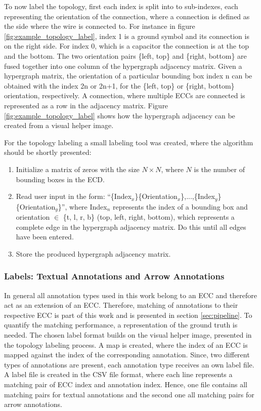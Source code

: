 To now label the topology, first each index is split into to sub-indexes, each representing the orientation of the connection, where a connection is defined as the side where the wire is connected to.
For instance in figure \ref{fig:example_topology_label}, index 1 is a ground symbol and its connection is on the right side.
For index 0, which is a capacitor the connection is at the top and the bottom.
The two orientation pairs \{left, top\} and \{right, bottom\} are fused together into one column of the hypergraph adjacency matrix.
Given a hypergraph matrix, the orientation of a particular bounding box index n can be obtained with the index 2n or 2n+1, for the \{left, top\} or \{right, bottom\} orientation, respectively.
A connection, where multiple \acp{ECC} are connected is represented as a row in the adjacency matrix.
Figure \ref{fig:example_topology_label} shows how the hypergraph adjacency can be created from a visual helper image.

For the topology labeling a small labeling tool was created, where the algorithm should be shortly presented:

\begin{enumerate}
    \item Initialize a matrix of zeros with the size $N \times N$, where $N$ is the number of bounding boxes in the \ac{ECD}.
    \item Read user input in the form: ``\{Index$_x$\}\{Orientation$_x$\},...,\{Index$_y$\}\{Orientation$_y$\}'', where Index$_n$ represents the index of a bounding box and orientation $\in$ \{t, l, r, b\} (top, left, right, bottom),  which represents a complete edge in the hypergraph adjacency matrix. Do this until all edges have been entered.
    \item Store the produced hypergraph adjacency matrix.
\end{enumerate}


\subsubsection{Labels: Textual Annotations and Arrow Annotations}

In general all annotation types used in this work belong to an \ac{ECC} and therefore act as an extension of an \ac{ECC}.
Therefore, matching of annotations to their respective \ac{ECC} is part of this work and is presented in section \ref{sec:pipeline}.
To quantify the matching performance, a representation of the ground truth is needed.
The chosen label format builds on the visual helper image, presented in the topology labeling process.
A map is created, where the index of an \ac{ECC} is mapped against the index of the corresponding annotation.
Since, two different types of annotations are present, each annotation type receives an own label file.
A label file is created in the \ac{CSV} file format, where each line represents a matching pair of \ac{ECC} index and annotation index.
Hence, one file contains all matching pairs for textual annotations and the second one all matching pairs for arrow annotations.
